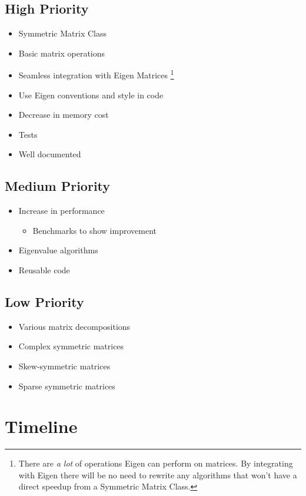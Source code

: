 \documentclass[aps,prl,reprint,groupedaddress,nofootinbib]{revtex4-1}
\begin{document}
\subsection{High Priority}
\label{sec:orgb4f4658}
\begin{itemize}
\item Symmetric Matrix Class
\item Basic matrix operations
\item Seamless integration with Eigen Matrices \footnote{There are \emph{a lot} of operations Eigen can perform on matrices. By integrating with Eigen there will be no need to rewrite any algorithms that won't have a direct speedup from a Symmetric Matrix Class.}
\item Use Eigen conventions and style in code
\item Decrease in memory cost
\item Tests
\item Well documented
\end{itemize}

\subsection{Medium Priority}
\label{sec:org5a2f617}
\begin{itemize}
\item Increase in performance
\begin{itemize}
\item Benchmarks to show improvement
\end{itemize}
\item Eigenvalue algorithms
\item Reusable code
\end{itemize}

\subsection{Low Priority}
\label{sec:orgecd57bb}
\begin{itemize}
\item Various matrix decompositions
\item Complex symmetric matrices
\item Skew-symmetric matrices
\item Sparse symmetric matrices
\end{itemize}

\section{Timeline}
\label{sec:orgd9a6b5f}
\end{document}

